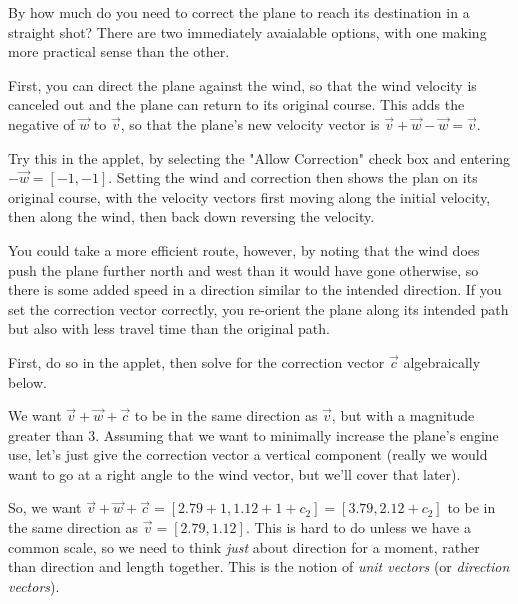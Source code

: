\documentclass{ximera}
\begin{document}
\begin{exploration}

  By how much do you need to correct the plane to reach its destination in a straight shot? There are two immediately avaialable options, with one making more practical sense than the other. 

\begin{example}
  First, you can direct the plane against the wind, so that the wind velocity is canceled out and the plane can return to its original course. This adds the negative of $\vec{w}$ to $\vec{v}$, so that the plane's new velocity vector is $\vec{v}+\vec{w}-\vec{w}=\vec{v}$.

  Try this in the applet, by selecting the "Allow Correction" check box and entering $-\vec{w}=[-1,-1]$. Setting the wind and correction then shows the plan on its original course, with the velocity vectors first moving along the initial velocity, then along the wind, then back down reversing the velocity. 

  \begin{center}
  \end{center}

  You could take a more efficient route, however, by noting that the wind does push the plane further north and west than it would have gone otherwise, so there is some added speed in a direction similar to the intended direction. If you set the correction vector correctly, you re-orient the plane along its intended path but also with less travel time than the original path.

  First, do so in the applet, then solve for the correction vector $\vec{c}$ algebraically below.
  
  We want $\vec{v}+\vec{w}+\vec{c}$ to be in the same direction as $\vec{v}$, but with a magnitude greater than $3$. Assuming that we want to minimally increase the plane's engine use, let's just give the correction vector a vertical component (really we would want to go at a right angle to the wind vector, but we'll cover that later). 

  So, we want $\vec{v}+\vec{w}+\vec{c}=[2.79+1,1.12+1+c_2]=[3.79,2.12+c_2]$ to be in the same direction as $\vec{v}=[2.79,1.12]$. This is hard to do unless we have a common scale, so we need to think \emph{just} about direction for a moment, rather than direction and length together. This is the notion of \textit{unit vectors} (or \textit{direction vectors}).


\end{example}
\end{exploration}
\end{document}
